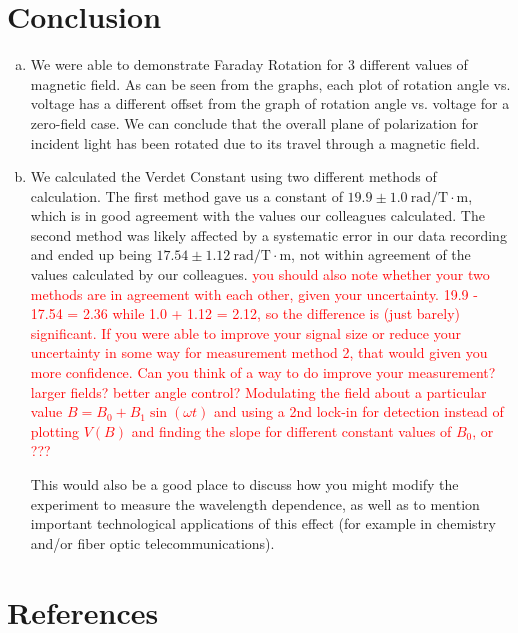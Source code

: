 \documentclass[prb,preprint]{revtex4-1}
\begin{document}
{\section{Conclusion}
{\begin{enumerate}[(a)]
\item We were able to demonstrate Faraday Rotation for 3 different values of magnetic field.  As can be seen from the graphs, each plot of rotation angle vs. voltage has a different offset from the graph of rotation angle vs. voltage for a zero-field case.  We can conclude that the overall plane of polarization for incident light has been rotated due to its travel through a magnetic field.
\item We calculated the Verdet Constant using two different methods of calculation.  The first method gave us a constant of $19.9 \pm 1.0 \mathrm{~rad/T} \cdot \textrm{m}$, which is in good agreement with the values our colleagues calculated.  The second method was likely affected by a systematic error in our data recording and ended up being $17.54 \pm 1.12 \mathrm{~rad/T} \cdot \textrm{m}$, not within agreement of the values calculated by our colleagues. 
\textcolor{red}{you should also note whether your two methods are in agreement with each other, given your uncertainty. 19.9 - 17.54 = 2.36 while 1.0 + 1.12 = 2.12, so the difference is (just barely) significant. If you were  able to improve your signal size or reduce your uncertainty in some way for measurement method 2, that would given you more confidence. Can you think of a way to do improve your measurement? larger fields? better angle control? Modulating the field about a particular value $B = B_0 + B_1 \sin(\omega t)$ and using a 2nd lock-in for detection instead of plotting $V(B)$ and finding the slope for different constant values of $B_0$, or ???}  

{\color{blue}  This would also be a good place to discuss how you might modify the experiment to measure the wavelength dependence, as well as to mention important technological applications of this effect (for example in chemistry and/or fiber optic telecommunications). }

\end{enumerate}}

\section{References}

\begin{thebibliography}{4}


\end{thebibliography}}
\end{document}
